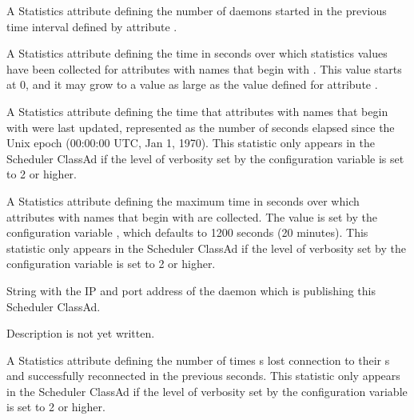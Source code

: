 \begin{description}
\item[\AdAttr{RecentShadowsStarted}:] A Statistics attribute defining
  the number of  daemons started
  in the previous time interval defined by attribute .

\item[\AdAttr{RecentStatsLifetime}:] A Statistics attribute defining
  the time in seconds over which statistics values have been collected 
  for attributes with names that begin with .
  This value starts at 0, and it may grow to a value as large as
  the value defined for attribute . 

\item[\AdAttr{RecentStatsTickTime}:] A Statistics attribute defining
  the time that attributes with names that begin with  
  were last updated,
  represented as the number of seconds elapsed since
  the Unix epoch (00:00:00 UTC, Jan 1, 1970).
  This statistic only appears in the Scheduler ClassAd if the level of
  verbosity set by the configuration variable 
  is set to 2 or higher.

\item[\AdAttr{RecentWindowMax}:] A Statistics attribute defining
  the maximum time in seconds over which 
  attributes with names that begin with  are collected.
  The value is set by the configuration variable
  , which defaults to 1200 seconds
  (20 minutes). 
  This statistic only appears in the Scheduler ClassAd if the level of
  verbosity set by the configuration variable 
  is set to 2 or higher.

\item[\AdAttr{ScheddIpAddr}:] String with the IP and port address of the
 daemon which is publishing this Scheduler ClassAd.

\item[\AdAttr{ServerTime}:] Description is not yet written.

\item[\AdAttr{ShadowsReconnections}:] A Statistics attribute defining
  the number of times s lost 
  connection to their s and successfully reconnected
  in the previous  seconds.
  This statistic only appears in the Scheduler ClassAd if the level of
  verbosity set by the configuration variable 
  is set to 2 or higher.


\end{description}
